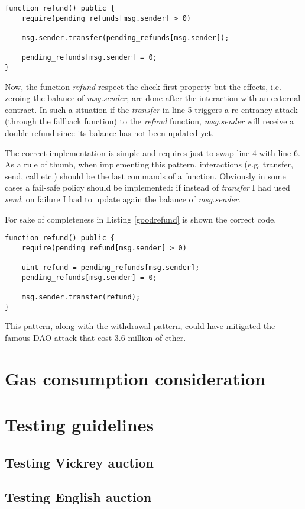 \documentclass{article}
\begin{document}
\begin{lstlisting}[language=Solidity, caption={Buggy refund function, vulnerable to re-entrancy attacks},captionpos=b, label=badrefund]
 function refund() public {
    require(pending_refunds[msg.sender] > 0)
    
    msg.sender.transfer(pending_refunds[msg.sender]);
    
    pending_refunds[msg.sender] = 0;
}
\end{lstlisting}

Now, the function \textit{refund} respect the check-first property but the effects, i.e. zeroing the balance of \textit{msg.sender}, are done after the interaction with an external contract. In such a situation if the \textit{transfer} in line 5 triggers a re-entrancy attack (through the fallback function) to the \textit{refund} function, \textit{msg.sender} will receive a double refund since its balance has not been updated yet.

The correct implementation is simple and requires just to swap line 4 with line 6. As a rule of thumb, when implementing this pattern, interactions (e.g. transfer, send, call etc.) should be the last commands of a function. Obviously in some cases a fail-safe policy should be implemented: if instead of \textit{transfer} I had used \textit{send}, on failure I had to update again the balance of \textit{msg.sender}.

For sake of completeness in Listing \ref{goodrefund} is shown the correct code.

\begin{lstlisting}[language=Solidity, caption={Correct refund function. Since on failure \textit{transfer} revert the transaction there is no need to check its returned value.},captionpos=b, label=goodrefund]
 function refund() public {
    require(pending_refund[msg.sender] > 0)
    
    uint refund = pending_refunds[msg.sender];
    pending_refunds[msg.sender] = 0;
    
    msg.sender.transfer(refund);
}
\end{lstlisting}

This pattern, along with the withdrawal pattern, could have mitigated the famous DAO attack that cost 3.6 million of ether.
\section{Gas consumption consideration}
\section{Testing guidelines}
\subsection{Testing Vickrey auction}
\subsection{Testing English auction}
\end{document}
